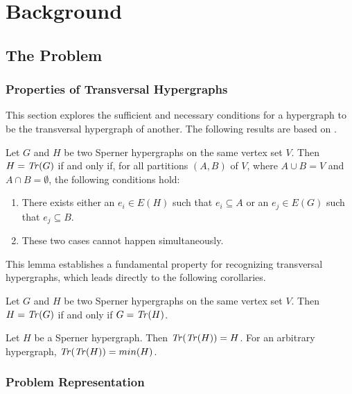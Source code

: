 \chapter{Background}

\section{The \TransHyp{} Problem}

\subsection{Properties of Transversal Hypergraphs}

This section explores the sufficient and necessary conditions for a hypergraph to be the transversal hypergraph of another. The following results are based on \cite{Ber87}.

\begin{lemma}\label{lem:partition}
Let $G$ and $H$ be two Sperner hypergraphs on the same vertex set $V$. Then $H=\mathit{Tr}(G)$ if and only if, for all partitions $(A,B)$ of $V$, where $A\cup B=V$ and $A\cap B=\emptyset$, the following conditions hold:
\begin{enumerate}
\item There exists either an $e_i\in E(H)$ such that $e_i\subseteq A$ or an $e_j\in E(G)$ such that $e_j\subseteq B$.
\item These two cases cannot happen simultaneously.
\end{enumerate}
\end{lemma}

This lemma establishes a fundamental property for recognizing transversal hypergraphs, which leads directly to the following corollaries.

\begin{corollary}
Let $G$ and $H$ be two Sperner hypergraphs on the same vertex set $V$. Then $H=\mathit{Tr}(G)$ if and only if $G=\mathit{Tr}(H)$.
\end{corollary}

\begin{corollary}
Let $H$ be a Sperner hypergraph. Then $\mathit{Tr}(\mathit{Tr}(H))=H$. For an arbitrary hypergraph, $\mathit{Tr}(\mathit{Tr}(H))=min(H)$.
\end{corollary}

\subsection{Problem Representation}

